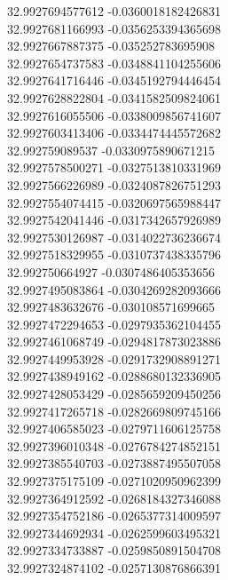 {32.9927694577612	-0.0360018182426831\\
32.9927681166993	-0.0356253394365698\\
32.9927667887375	-0.035252783695908\\
32.9927654737583	-0.0348841104255606\\
32.9927641716446	-0.0345192794446454\\
32.9927628822804	-0.0341582509824061\\
32.9927616055506	-0.0338009856741607\\
32.9927603413406	-0.0334474445572682\\
32.992759089537	-0.0330975890671215\\
32.9927578500271	-0.0327513810331969\\
32.9927566226989	-0.0324087826751293\\
32.9927554074415	-0.0320697565988447\\
32.9927542041446	-0.0317342657926989\\
32.9927530126987	-0.0314022736236674\\
32.9927518329955	-0.0310737438335796\\
32.992750664927	-0.0307486405353656\\
32.9927495083864	-0.0304269282093666\\
32.9927483632676	-0.030108571699665\\
32.9927472294653	-0.0297935362104455\\
32.9927461068749	-0.0294817873023886\\
32.9927449953928	-0.0291732908891271\\
32.9927438949162	-0.0288680132336905\\
32.9927428053429	-0.0285659209450256\\
32.9927417265718	-0.0282669809745166\\
32.9927406585023	-0.0279711606125758\\
32.9927396010348	-0.0276784274852151\\
32.9927385540703	-0.0273887495507058\\
32.9927375175109	-0.0271020950962399\\
32.9927364912592	-0.0268184327346088\\
32.9927354752186	-0.0265377314009597\\
32.9927344692934	-0.0262599603495321\\
32.9927334733887	-0.0259850891504708\\
32.9927324874102	-0.0257130876866391\\
}
